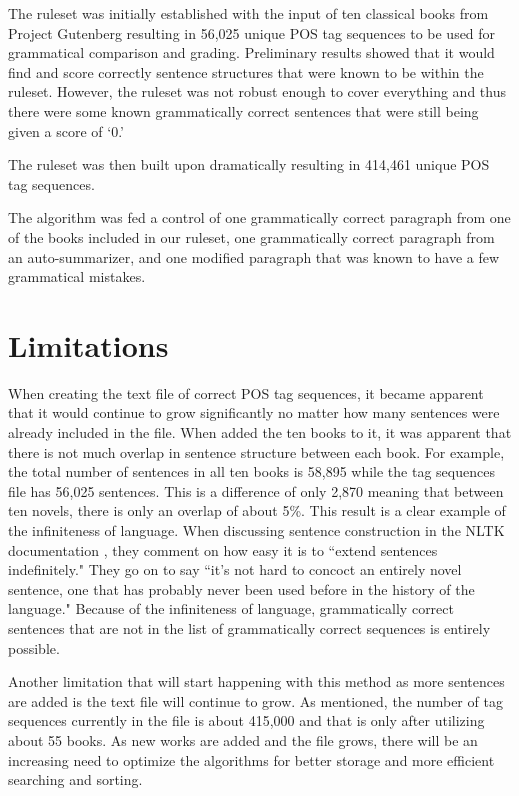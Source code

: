 \documentclass[11pt,a4paper]{article}
\begin{document}
\begin{multicols}{2}
The ruleset was initially established with the input of ten classical books from Project Gutenberg resulting in 56,025 unique POS tag sequences to be used for grammatical comparison and grading. Preliminary results showed that it would find and score correctly sentence structures that were known to be within the ruleset. However, the ruleset was not robust enough to cover everything and thus there were some known grammatically correct sentences that were still being given a score of `0.'

The ruleset was then built upon dramatically resulting in 414,461 unique POS tag sequences.

The algorithm was fed a control of one grammatically correct paragraph from one of the books included in our ruleset, one grammatically correct paragraph from an auto-summarizer, and one modified paragraph that was known to have a few grammatical mistakes.


\section{Limitations}
When creating the text file of correct POS tag sequences, it became apparent that it would continue to grow significantly no matter how many sentences were already included in the file. When added the ten books to it, it was apparent that there is not much overlap in sentence structure between each book. For example, the total number of sentences in all ten books is 58,895 while the tag sequences file has 56,025 sentences. This is a difference of only 2,870 meaning that between ten novels, there is only an overlap of about 5\%. This result is a clear example of the infiniteness of language. When discussing sentence construction in the NLTK documentation \cite{nltk}, they comment on how easy it is to ``extend sentences indefinitely." They go on to say ``it's not hard to concoct an entirely novel sentence, one that has probably never been used before in the history of the language." Because of the infiniteness of language, grammatically correct sentences that are not in the list of grammatically correct sequences is entirely possible.

Another limitation that will start happening with this method as more sentences are added is the text file will continue to grow. As mentioned, the number of tag sequences currently in the file is about 415,000 and that is only after utilizing about 55 books. As new works are added and the file grows, there will be an increasing need to optimize the algorithms for better storage and more efficient searching and sorting.


\end{multicols}
\end{document}
